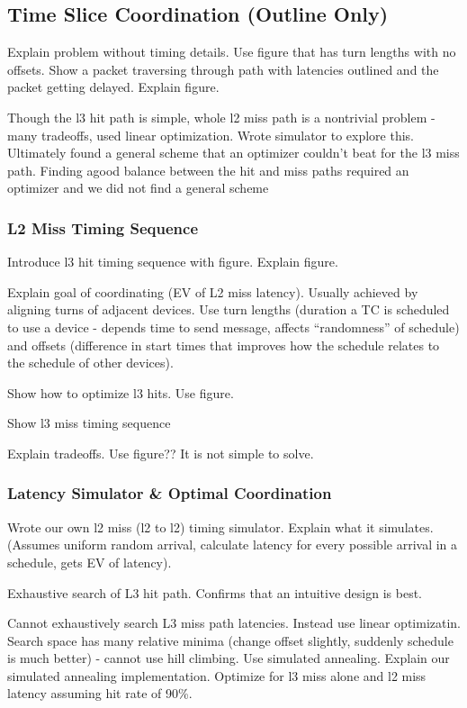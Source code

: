 \subsection{Time Slice Coordination (Outline Only)}
\label{sec:coordination}

Explain problem without timing details. Use figure that has turn lengths with 
no offsets. Show a packet traversing through path with latencies outlined and 
the packet getting delayed. Explain figure.

Though the l3 hit path is simple, whole l2 miss 
path is a nontrivial problem - many tradeoffs, used linear 
optimization. Wrote simulator to explore this. Ultimately found a general scheme
that an optimizer couldn't beat for the l3 miss path. Finding agood balance between
the hit and miss paths required an optimizer and we did not find a general scheme

\subsubsection{L2 Miss Timing Sequence}
Introduce l3 hit timing sequence with figure. Explain figure.

Explain goal of coordinating (EV of L2 miss latency). Usually achieved by 
aligning turns of adjacent devices. Use turn lengths (duration a TC is 
scheduled to use a device - depends time to send message, affects 
``randomness'' of schedule) and offsets (difference in start times that
improves how the schedule relates to the schedule of other devices).

Show how to optimize l3 hits. Use figure.

Show l3 miss timing sequence

Explain tradeoffs. Use figure?? It is not simple to solve.

\subsubsection{Latency Simulator \& Optimal Coordination}
Wrote our own l2 miss (l2 to l2) timing simulator. Explain what it simulates. (Assumes 
uniform random arrival, calculate latency for every possible arrival in a 
schedule, gets EV of latency).

Exhaustive search of L3 hit path. Confirms that an intuitive design is best.

Cannot exhaustively search L3 miss path latencies. Instead use linear 
optimizatin. Search space has many relative minima (change offset slightly, 
suddenly schedule is much better) - cannot use hill climbing. Use simulated 
annealing. Explain our simulated annealing implementation. Optimize for l3 miss 
alone and l2 miss latency assuming hit rate of 90\%.

